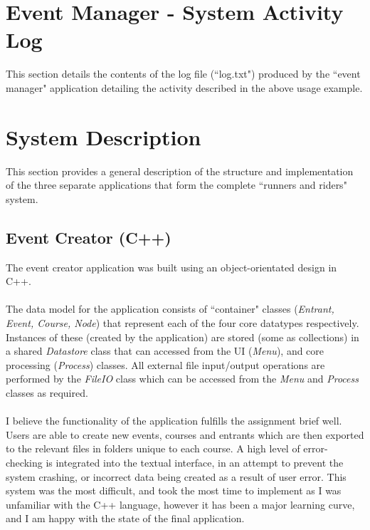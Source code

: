 \documentclass[a4paper, 10pt]{article}
\begin{document}
\clearpage
\section{Event Manager - System Activity Log}
This section details the contents of the log file (``log.txt") produced by the ``event manager" application detailing the activity described in the above usage example.



\clearpage
\section{System Description}

This section provides a general description of the structure and implementation of the three separate applications that form the complete ``runners and riders" system.

\subsection{Event Creator (C++)}

The event creator application was built using an object-orientated design in C++.\\\\
The data model for the application consists of ``container" classes (\textit{Entrant, Event, Course, Node}) that represent each of the four core datatypes respectively. Instances of these (created by the application) are stored (some as collections) in a shared \textit{Datastore} class that can accessed from the UI (\textit{Menu}), and core processing (\textit{Process}) classes. All external file input/output operations are performed by the \textit{FileIO} class which can be accessed from the \textit{Menu} and \textit{Process} classes as required. \\\\
I believe the functionality of the application fulfills the assignment brief well. Users are able to create new events, courses and entrants which are then exported to the relevant files in folders unique to each course. A high level of error-checking is integrated into the textual interface, in an attempt to prevent the system crashing, or incorrect data being created as a result of user error. This system was the most difficult, and took the most time to implement as I was unfamiliar with the C++ language, however it has been a major learning curve, and I am happy with the state of the final application.
\end{document}
